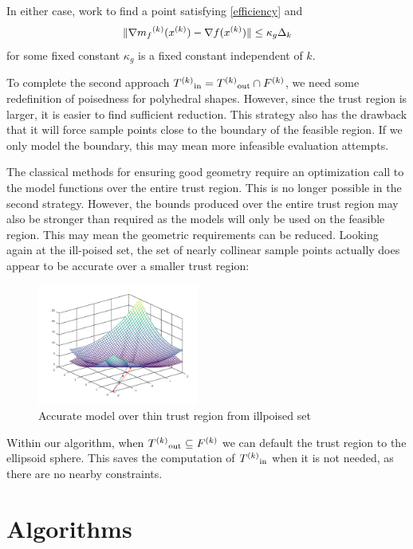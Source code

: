 In either case, work to find a point satisfying \cref{efficiency} and 
\begin{equation}
\label{accuracy}
\|\nabla {{m}_f}^{(k)}({x}^{(k)}) - \nabla f({x}^{(k)}) \| \le \kappa_g \Delta_k
\end{equation}
 for some fixed constant $\kappa_g$ is a fixed constant independent of $k$.

 

To complete the second approach ${T^{(k)}}_{\text{in}} = {T^{(k)}}_{\text{out}} \cap {F}^{(k)}$, we need some redefinition of poisedness for polyhedral shapes.
However, since the trust region is larger, it is easier to find sufficient reduction.
This strategy also has the drawback that it will force sample points close to the boundary of the feasible region.
If we only model the boundary, this may mean more infeasible evaluation attempts.

The classical methods for ensuring good geometry require an optimization call to the model functions over the entire trust region.
This is no longer possible in the second strategy.
However, the bounds produced over the entire trust region may also be stronger than required as the models will only be used on the feasible region.
This may mean the geometric requirements can be reduced.
Looking again at the ill-poised set, the set of nearly collinear sample points actually does appear to be accurate over a smaller trust region:


\begin{figure}[h]
    \centering
    \includegraphics[width=200px]{images/poised_bad_but_good.png}
    \caption{Accurate model over thin trust region from illpoised set}
    \label{aoip}
\end{figure}


Within our algorithm, when $ {T^{(k)}}_{\text{out}} \subseteq {F}^{(k)}$ we can default the trust region to the ellipsoid sphere.
This saves the computation of ${T^{(k)}}_{\text{in}}$ when it is not needed, as there are no nearby constraints.



\section{Algorithms}

